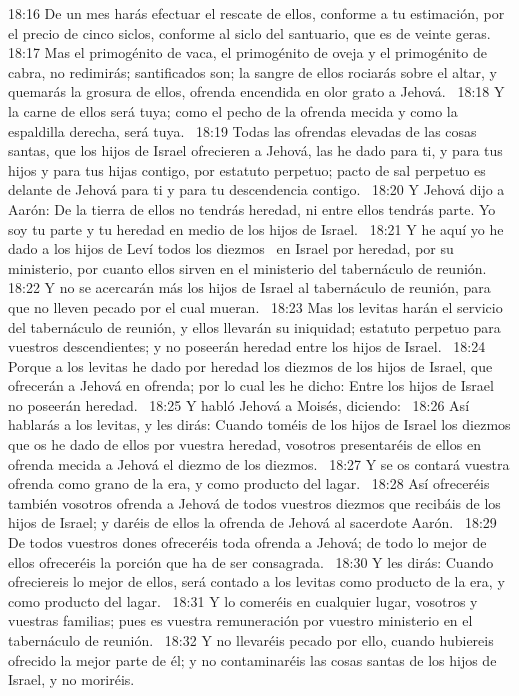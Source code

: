 18:16 De un mes harás efectuar el rescate de ellos, conforme a tu estimación, por el precio de cinco siclos, conforme al siclo del santuario, que es de veinte geras.  
18:17 Mas el primogénito de vaca, el primogénito de oveja y el primogénito de cabra, no redimirás; santificados son; la sangre de ellos rociarás sobre el altar, y quemarás la grosura de ellos, ofrenda encendida en olor grato a Jehová.  
18:18 Y la carne de ellos será tuya; como el pecho de la ofrenda mecida y como la espaldilla derecha, será tuya.  
18:19 Todas las ofrendas elevadas de las cosas santas, que los hijos de Israel ofrecieren a Jehová, las he dado para ti, y para tus hijos y para tus hijas contigo, por estatuto perpetuo; pacto de sal perpetuo es delante de Jehová para ti y para tu descendencia contigo.  
18:20 Y Jehová dijo a Aarón: De la tierra de ellos no tendrás heredad, ni entre ellos tendrás parte. Yo soy tu parte y tu heredad en medio de los hijos de Israel.  
18:21 Y he aquí yo he dado a los hijos de Leví todos los diezmos  en Israel por heredad, por su ministerio, por cuanto ellos sirven en el ministerio del tabernáculo de reunión.  
18:22 Y no se acercarán más los hijos de Israel al tabernáculo de reunión, para que no lleven pecado por el cual mueran.  
18:23 Mas los levitas harán el servicio del tabernáculo de reunión, y ellos llevarán su iniquidad; estatuto perpetuo para vuestros descendientes; y no poseerán heredad entre los hijos de Israel.  
18:24 Porque a los levitas he dado por heredad los diezmos de los hijos de Israel, que ofrecerán a Jehová en ofrenda; por lo cual les he dicho: Entre los hijos de Israel no poseerán heredad.  
18:25 Y habló Jehová a Moisés, diciendo:  
18:26 Así hablarás a los levitas, y les dirás: Cuando toméis de los hijos de Israel los diezmos que os he dado de ellos por vuestra heredad, vosotros presentaréis de ellos en ofrenda mecida a Jehová el diezmo de los diezmos.  
18:27 Y se os contará vuestra ofrenda como grano de la era, y como producto del lagar.  
18:28 Así ofreceréis también vosotros ofrenda a Jehová de todos vuestros diezmos que recibáis de los hijos de Israel; y daréis de ellos la ofrenda de Jehová al sacerdote Aarón.  
18:29 De todos vuestros dones ofreceréis toda ofrenda a Jehová; de todo lo mejor de ellos ofreceréis la porción que ha de ser consagrada.  
18:30 Y les dirás: Cuando ofreciereis lo mejor de ellos, será contado a los levitas como producto de la era, y como producto del lagar.  
18:31 Y lo comeréis en cualquier lugar, vosotros y vuestras familias; pues es vuestra remuneración por vuestro ministerio en el tabernáculo de reunión.  
18:32 Y no llevaréis pecado por ello, cuando hubiereis ofrecido la mejor parte de él; y no contaminaréis las cosas santas de los hijos de Israel, y no moriréis. 

